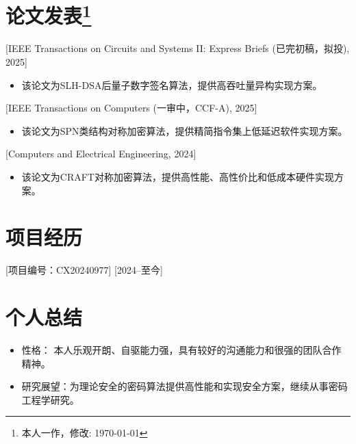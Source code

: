 \documentclass{resume}
\begin{document}
\section{论文发表\protect\footnote{本人一作，修改: \today}}

[IEEE Transactions on Circuits and Systems II: Express Briefs (已完初稿，拟投), 2025]
\begin{itemize}
  \item 该论文为SLH-DSA后量子数字签名算法，提供高吞吐量异构实现方案。
\end{itemize}

[IEEE Transactions on Computers (一审中，CCF-A), 2025]
\begin{itemize}
  \item 该论文为SPN类结构对称加密算法，提供精简指令集上低延迟软件实现方案。
\end{itemize}

[Computers and Electrical Engineering, 2024]
\begin{itemize}
  \item 该论文为CRAFT对称加密算法，提供高性能、高性价比和低成本硬件实现方案。
\end{itemize}

\section{项目经历}
[项目编号：CX20240977]
[2024--至今]

\section{个人总结}

\begin{itemize}
  \item 性格： 本人乐观开朗、自驱能力强，具有较好的沟通能力和很强的团队合作精神。
  \item 研究展望：为理论安全的密码算法提供高性能和实现安全方案，继续从事密码工程学研究。
\end{itemize}
\end{document}
